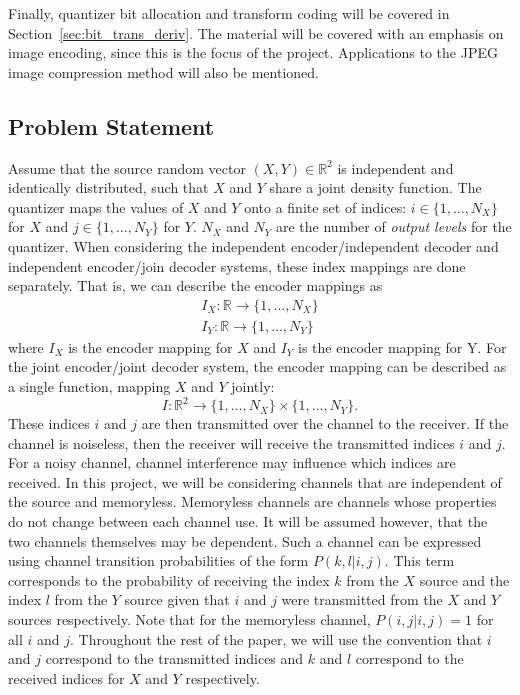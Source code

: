 \documentclass[10pt]{article}
\newcommand{\real}{\mathbb{R}}
\begin{document}
Finally, quantizer bit allocation and transform coding will be covered in Section~\ref{sec:bit_trans_deriv}. The material will be covered with an emphasis on image encoding, since this is the focus of the project. Applications to the JPEG image compression method will also be mentioned.

\subsection{Problem Statement}
\label{sec:prob_state}
Assume that the source random vector $(X,Y)\in\real^2$ is independent and identically distributed, such that $X$ and $Y$ share a joint density function. The quantizer maps the values of $X$ and $Y$ onto a finite set of indices: $i\in\{1,\ldots,N_X\}$ for $X$ and $j\in\{1,\ldots,N_Y\}$ for $Y$. $N_X$ and $N_Y$ are the number of \emph{output levels} for the quantizer. When considering the independent encoder/independent decoder and independent encoder/join decoder systems, these index mappings are done separately. That is, we can describe the encoder mappings as
\begin{gather*}
    I_X : \real\to\{1,\ldots,N_X\} \\
    I_Y : \real\to\{1,\ldots,N_Y\}
\end{gather*}
where $I_X$ is the encoder mapping for $X$ and $I_Y$ is the encoder mapping for Y. For the joint encoder/joint decoder system, the encoder mapping can be described as a single function, mapping $X$ and $Y$ jointly:
\begin{equation*}
    I : \real^2\to\{1,\ldots,N_X\} \times \{1,\ldots,N_Y\}.
\end{equation*}
These indices $i$ and $j$ are then transmitted over the channel to the receiver. If the channel is noiseless, then the receiver will receive the transmitted indices $i$ and $j$. For a noisy channel, channel interference may influence which indices are received. In this project, we will be considering channels that are independent of the source and memoryless. Memoryless channels are channels whose properties do not change between each channel use. It will be assumed however, that the two channels themselves may be dependent. Such a channel can be expressed using channel transition probabilities of the form $P(k,l|i,j)$. This term corresponds to the probability of receiving the index $k$ from the $X$ source and the index $l$ from the $Y$ source given that $i$ and $j$ were transmitted from the $X$ and $Y$ sources respectively. Note that for the memoryless channel, $P(i,j|i,j)=1$ for all $i$ and $j$. Throughout the rest of the paper, we will use the convention that $i$ and $j$ correspond to the transmitted indices and $k$ and $l$ correspond to the received indices for $X$ and $Y$ respectively.
\end{document}
